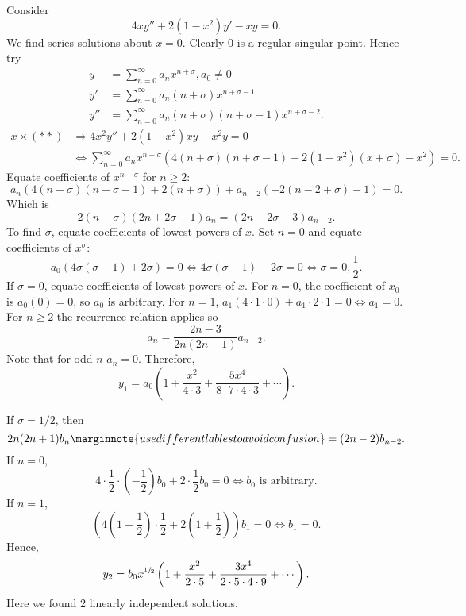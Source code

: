 \documentclass[10pt]{article}
\def\ge{\geqslant}
\begin{document}
    \begin{example}
        Consider
        \[
            4xy''+2(1-x^2)y'-xy=0\tag{$**$}
        .\]
        We find series solutions about $x=0$. Clearly $0$ is a regular singular point. Hence try
        \[
            \begin{aligned}
                y&=\sum_{n=0}^{\infty}a_nx^{n+\sigma}, a_0\neq 0\\
                y'&= \sum_{n=0}^{\infty}a_n(n+\sigma)x^{n+\sigma-1}\\
                y''&=\sum_{n=0}^{\infty} a_n(n+\sigma)(n+\sigma-1)x^{n+\sigma-2}.
            \end{aligned}
        \]
        \[
            \begin{aligned}
                 x \times (**)&\Longrightarrow 4x^2y''+2(1-x^2)xy-x^2y=0\\
                &\Longleftrightarrow \sum_{n=0}^{\infty}a_nx^{n+\sigma}\left( 4(n+\sigma)(n+\sigma-1)+2(1-x^2)(x+\sigma)-x^2 \right)=0.
            \end{aligned}
        \]
        Equate coefficients of $x^{n+\sigma}$ for $n\ge 2$:
        \[
            a_n\left( 4(n+\sigma)(n+\sigma-1)+2(n+\sigma) \right)+a_{n-2}\left( -2(n-2+\sigma)-1 \right)=0
        .\]
        Which is 
        \[
            2(n+\sigma)(2n+2\sigma-1)a_n=(2n+2\sigma-3)a_{n-2}
        .\]
        To find $\sigma$, equate coefficients of lowest powers of $x$. Set $n=0$ and equate coefficients of $x^\sigma$:
        \[
            a_0(4\sigma(\sigma-1)+2\sigma)=0 \Longleftrightarrow 4\sigma(\sigma-1)+2\sigma=0 \Longleftrightarrow \sigma=0,\frac{1}{2}
        .\]
        If $ \sigma=0 $, equate coefficients of lowest powers of $x$. For $n=0$, the coefficient of $x_0$ is $a_0(0)=0$, so $a_0$ is arbitrary. For $n=1$, $ a_1(4 \cdot 1 \cdot 0)+a_1 \cdot 2 \cdot 1=0 \Leftrightarrow a_1=0 $. For $n\ge 2$ the recurrence relation applies so 
        \[
            a_n = \frac{2n-3}{2n(2n-1)}a_{n-2}
        .\]
        Note that for odd $n$ $a_n=0$. Therefore,
        \[
            y_1=a_0\left( 1+\frac{x^2}{4\cdot 3}+\frac{5x^4}{8\cdot 7\cdot 4\cdot 3}+\cdots \right)
        .\]

        If $\sigma=1/2$, then 
        \[
            2n(2n+1)b_n\marginnote{use different lables to avoid confusion} = (2n-2)b_{n-2}
        .\]
        If $n=0$, 
        \[
            4\cdot \frac{1}{2}\cdot \left( -\frac{1}{2} \right)b_0+2\cdot \frac{1}{2}b_0=0 \Longleftrightarrow b_0 \text{ is arbitrary}
        .\]
        If $n=1$,
        \[
            \left( 4(1+\frac{1}{2})\cdot \frac{1}{2}+2(1+\frac{1}{2}) \right)b_1=0 \Longleftrightarrow b_1=0
        .\]
        Hence,
        \[
            y_2=b_0x^{\sfrac{1}{2}}\left( 1+\frac{x^2}{2\cdot 5}+\frac{3x^4}{2\cdot 5\cdot 4\cdot 9}+\cdots \right)
        .\]
        Here we found 2 linearly independent solutions.
    \end{example}
\end{document}
